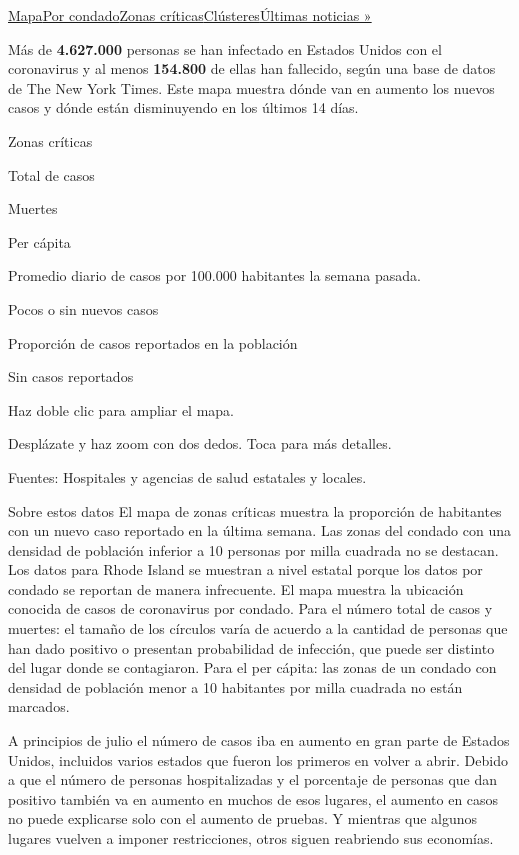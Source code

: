 \protect\hyperlink{map}{Mapa}\protect\hyperlink{states}{Por
condado}\protect\hyperlink{hotspots}{Zonas
críticas}\protect\hyperlink{clusters}{Clústeres}\href{https://www.nytimes.com/2020/08/01/world/coronavirus-covid-19.html}{Últimas
noticias »}

Más de \textbf{4.627.000} personas se han infectado en Estados Unidos
con el coronavirus y al menos \textbf{154.800} de ellas han fallecido,
según una base de datos de The New York Times. Este mapa muestra dónde
van en aumento los nuevos casos y dónde están disminuyendo en los
últimos 14 días.

Zonas críticas

Total de casos

Muertes

Per cápita

Promedio diario de casos por 100.000 habitantes la semana pasada.

Pocos o sin nuevos casos

Proporción de casos reportados en la población

Sin casos reportados

Haz doble clic para ampliar el mapa.

Desplázate y haz zoom con dos dedos. Toca para más detalles.

Fuentes: Hospitales y agencias de salud estatales y locales.

Sobre estos datos El mapa de zonas críticas muestra la proporción de
habitantes con un nuevo caso reportado en la última semana. Las zonas
del condado con una densidad de población inferior a 10 personas por
milla cuadrada no se destacan. Los datos para Rhode Island se muestran a
nivel estatal porque los datos por condado se reportan de manera
infrecuente. El mapa muestra la ubicación conocida de casos de
coronavirus por condado. Para el número total de casos y muertes: el
tamaño de los círculos varía de acuerdo a la cantidad de personas que
han dado positivo o presentan probabilidad de infección, que puede ser
distinto del lugar donde se contagiaron. Para el per cápita: las zonas
de un condado con densidad de población menor a 10 habitantes por milla
cuadrada no están marcados.

A principios de julio el número de casos iba en aumento en gran parte de
Estados Unidos, incluidos varios estados que fueron los primeros en
volver a abrir. Debido a que el número de personas hospitalizadas y el
porcentaje de personas que dan positivo también va en aumento en muchos
de esos lugares, el aumento en casos no puede explicarse solo con el
aumento de pruebas. Y mientras que algunos lugares vuelven a imponer
restricciones, otros siguen reabriendo sus economías.

